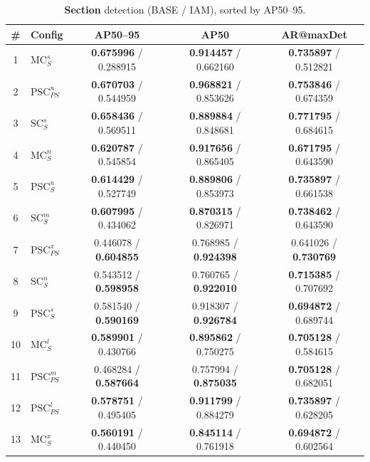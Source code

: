 \begin{table}[t]
 \centering
 \scriptsize
 \setlength{\tabcolsep}{4pt}
 \renewcommand{\arraystretch}{1.25}
 \caption{\textbf{Section} detection (BASE / IAM), sorted by AP50--95.}
 \begin{tabular}{|c|l|c|c|c|}
 \hline
 \textbf{\#} & Config & AP50--95 & AP50 & AR@maxDet \\
 \hline 1 & $\mathrm{MC}_{S}^{s}$ & \textbf{0.675996} / 0.288915 & \textbf{0.914457} / 0.662160 & \textbf{0.735897} / 0.512821 \\
 \hline 2 & $\mathrm{PSC}_{PS}^{n}$ & \textbf{0.670703} / 0.544959 & \textbf{0.968821} / 0.853626 & \textbf{0.753846} / 0.674359 \\
 \hline 3 & $\mathrm{SC}_{S}^{s}$ & \textbf{0.658436} / 0.569511 & \textbf{0.889884} / 0.848681 & \textbf{0.771795} / 0.684615 \\
 \hline 4 & $\mathrm{MC}_{S}^{n}$ & \textbf{0.620787} / 0.545854 & \textbf{0.917656} / 0.865405 & \textbf{0.671795} / 0.643590 \\
 \hline 5 & $\mathrm{PSC}_{S}^{n}$ & \textbf{0.614429} / 0.527749 & \textbf{0.889806} / 0.853973 & \textbf{0.735897} / 0.661538 \\
 \hline 6 & $\mathrm{SC}_{S}^{m}$ & \textbf{0.607995} / 0.434062 & \textbf{0.870315} / 0.826971 & \textbf{0.738462} / 0.643590 \\
 \hline 7 & $\mathrm{PSC}_{PS}^{x}$ & 0.446078 / \textbf{0.604855} & 0.768985 / \textbf{0.924398} & 0.641026 / \textbf{0.730769} \\
 \hline 8 & $\mathrm{SC}_{S}^{n}$ & 0.543512 / \textbf{0.598958} & 0.760765 / \textbf{0.922010} & \textbf{0.715385} / 0.707692 \\
 \hline 9 & $\mathrm{PSC}_{S}^{s}$ & 0.581540 / \textbf{0.590169} & 0.918307 / \textbf{0.926784} & \textbf{0.694872} / 0.689744 \\
 \hline 10 & $\mathrm{MC}_{S}^{l}$ & \textbf{0.589901} / 0.430766 & \textbf{0.895862} / 0.750275 & \textbf{0.705128} / 0.584615 \\
 \hline 11 & $\mathrm{PSC}_{PS}^{m}$ & 0.468284 / \textbf{0.587664} & 0.757994 / \textbf{0.875035} & \textbf{0.705128} / 0.682051 \\
 \hline 12 & $\mathrm{PSC}_{PS}^{l}$ & \textbf{0.578751} / 0.495405 & \textbf{0.911799} / 0.884279 & \textbf{0.735897} / 0.628205 \\
 \hline 13 & $\mathrm{MC}_{S}^{x}$ & \textbf{0.560191} / 0.440450 & \textbf{0.845114} / 0.761918 & \textbf{0.694872} / 0.602564 \\

\end{tabular}
\end{table}
